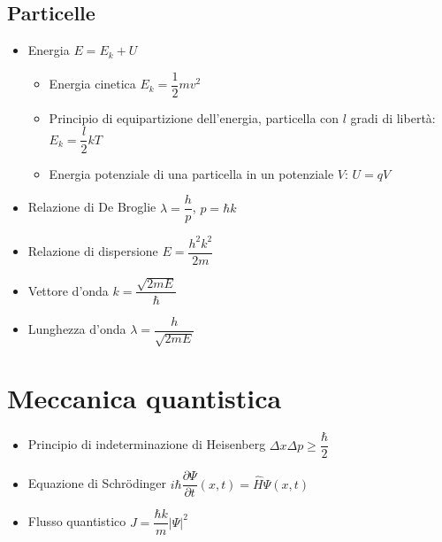 \documentclass{article}
\begin{document}
\subsection{Particelle}
\begin{itemize}
  \item Energia \( E = E_k + U \)
        \begin{itemize}
          \item Energia cinetica \( E_k = \dfrac{1}{2} m v ^ 2 \)
          \item Principio di equipartizione dell'energia, particella con \( l \) gradi di libertà: \( E_k = \dfrac{l}{2} k T \)
          \item Energia potenziale di una particella in un potenziale \( V \): \( U = qV \)
        \end{itemize}
  \item Relazione di De Broglie \( \lambda = \dfrac{h}{p} \), \( p = \hbar k \)
  \item Relazione di dispersione \( E = \dfrac{h ^ 2 k ^ 2}{2 m} \)
  \item Vettore d'onda \( k = \dfrac{\sqrt{2mE}}{\hbar} \)
  \item Lunghezza d'onda \( \lambda = \dfrac{h}{\sqrt{2mE}} \)
\end{itemize}

\section{Meccanica quantistica}
\begin{itemize}
  \item Principio di indeterminazione di Heisenberg \( \Delta x \Delta p \geq \dfrac{\hbar}{2} \)
  \item Equazione di Schrödinger \( i \hbar \dfrac{\partial \Psi}{\partial t} (x, t) = \hat{H} \Psi (x,t) \)
  \item Flusso quantistico \( J = \dfrac{\hbar k}{m} \left| \Psi \right| ^ 2 \)
\end{itemize}
\end{document}
